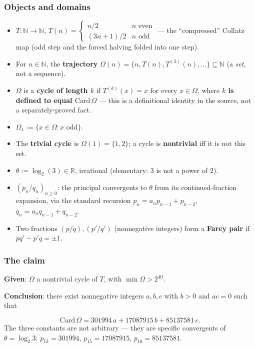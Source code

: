 \documentclass[11pt]{article}
\begin{document}
\subsubsection*{Objects and domains}
\begin{itemize}
\item $T : \mathbb{N} \to \mathbb{N}$, $T(n) = \begin{cases} n/2 & n \text{ even} \\ (3n+1)/2 & n \text{ odd} \end{cases}$ --- the ``compressed'' Collatz map (odd step and the forced halving folded into one step).
\item For $n \in \mathbb{N}$, the \textbf{trajectory} $\Omega(n) = \{n, T(n), T^{(2)}(n), \dots\} \subseteq \mathbb{N}$ (a \emph{set}, not a sequence).
\item $\Omega$ is a \textbf{cycle of length $k$} if $T^{(k)}(x) = x$ for every $x \in \Omega$, where \textbf{$k$ is defined to equal $\mathrm{Card}\,\Omega$} --- this is a definitional identity in the source, not a separately-proved fact.
\item $\Omega_1 := \{x \in \Omega : x \text{ odd}\}$.
\item The \textbf{trivial cycle} is $\Omega(1) = \{1, 2\}$; a cycle is \textbf{nontrivial} iff it is not this set.
\item $\theta := \log_2(3) \in \mathbb{R}$, irrational (elementary: $3$ is not a power of $2$).
\item $(p_n/q_n)_{n \ge 0}$: the principal convergents to $\theta$ from its continued-fraction expansion, via the standard recursion $p_n = a_n p_{n-1} + p_{n-2}$, $q_n = a_n q_{n-1} + q_{n-2}$.
\item Two fractions $(p/q), (p'/q')$ (nonnegative integers) form a \textbf{Farey pair} if $pq' - p'q = \pm 1$.
\end{itemize}
\subsubsection*{The claim}
\textbf{Given}: $\Omega$ a nontrivial cycle of $T$, with $\min \Omega > 2^{40}$.

\textbf{Conclusion}: there exist nonnegative integers $a, b, c$ with $b > 0$ and $ac = 0$ such that

\[ \mathrm{Card}\,\Omega = 301994\,a + 17087915\,b + 85137581\,c. \]
The three constants are not arbitrary --- they are specific convergents of $\theta = \log_2 3$: $p_{13} = 301994$, $p_{15} = 17087915$, $p_{16} = 85137581$.
\end{document}
